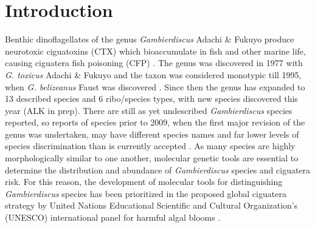 \documentclass[12pt]{article}
\begin{document}
\section{Introduction}
Benthic dinoflagellates of the genus \emph{Gambierdiscus} Adachi \& Fukuyo produce neurotoxic ciguatoxins (CTX) which bioaccumulate in fish and other marine life, causing ciguatera fish poisoning (CFP) \citep{chinain1997intraspecific,holmes1998gambierdiscus}. The genus was discovered in 1977 with \emph{G. toxicus} Adachi \& Fukuyo \citep{adachi1979thecal} and the taxon was considered monotypic till 1995, when \emph{G. belizeanus} Faust was discovered \citep{faust1995observation}. Since then the genus has expanded to 13 described species and 6 ribo/species types, with new species discovered this year \citep{fraga2016gambierdiscus,litaker2010global,adachi1979thecal,faust1995observation,chinain1999morphology,litaker2009taxonomy,nishimura2014morphology,fraga2011gambierdiscus,xu2014distribution,fraga2014genus} (ALK in prep).
There are still as yet undescribed \textit{Gambierdiscus }species reported,  so reports of species prior to 2009, when the first major revision of the genus was undertaken, may have different species names and far lower levels of species discrimination than is currently accepted \citep{berdalet2012global,nishimura2014morphology}. As many species are highly morphologically similar to one another, molecular genetic tools are essential to determine the distribution and abundance of  \textit{Gambierdiscus} species  and ciguatera risk. For this reason, the development of molecular tools for distinguishing \textit{Gambierdiscus} species has been prioritized in the proposed global ciguatera strategy by United Nations Educational Scientific and Cultural Organization's (UNESCO) international panel for harmful algal blooms \citep{litaker2010global,globalcig}. \\
\end{document}
